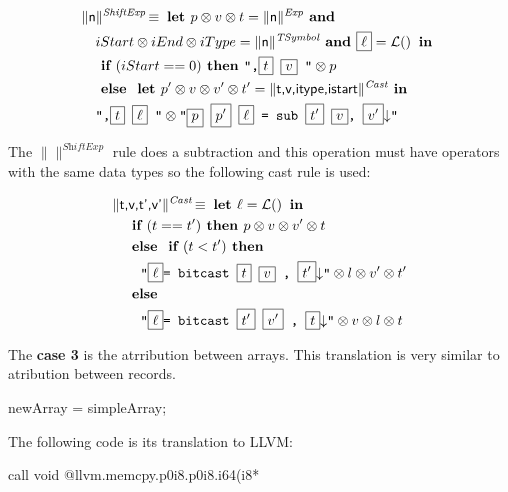 \documentclass{llncs}
\newcommand{\trad}[2]{\ensuremath{\lVert \textsf{#1} \rVert^{\textit{#2}}}}
\newcommand{\nl}[0]{\ensuremath{\downarrow}}
\DeclareMathOperator{\isdef}{\equiv}
\DeclareMathOperator{\lbl}{\mathcal{L}()}
\newcommand{\llvm}[1]{\texttt{#1}}
\newcommand{\IF}[0]{\textbf{ if }}
\newcommand{\ELSE}[0]{\textbf{ else }}
\newcommand{\THEN}[0]{\textbf{ then }}
\newcommand{\LET}[0]{\textbf{ let }}
\newcommand{\IN}[0]{\textbf{ in }}
\newcommand{\AND}[0]{\textbf{ and }}
\newcommand{\PH}[1]{\framebox{$#1$}}
\newcommand{\sep}[0]{\otimes}
\begin{document}
\begin{align*}
&\trad{n}{ShiftExp} \isdef \LET p \sep v \sep t  = \trad{n}{Exp} \AND \\
&\quad iStart \sep iEnd \sep iType = \trad{n}{TSymbol}  \AND  \PH{\ell} = \lbl \IN \\
&\quad \IF ( iStart == 0 ) \THEN  \llvm{",\PH{t} \PH{v} "} \sep p \\
&\quad \ELSE \LET  p' \sep v \sep v' \sep t'  = \trad{t,v,itype,istart}{Cast} \IN \\
&\quad \llvm{",\PH{t} \PH{\ell} "} \sep  \llvm{"\PH{p} \PH{p'}  \PH{\ell} = sub \PH{t'} \PH{v}, \PH{v'}\nl"}  \\
\end{align*}

The \trad{}{ShiftExp} rule does a subtraction and this operation must have operators with the same data types so the following cast rule is used:

\begin{align*}
&\trad{t,v,t',v'}{Cast} \isdef \LET  \ell = \lbl \IN \\
&\quad \IF ( t == t') \THEN p \sep v \sep v' \sep t  \\
&\quad \ELSE \IF (t<t') \THEN \\
&\quad \quad \llvm{"\PH{\ell}= bitcast \PH{t} \PH{v} , \PH{t'}\nl"}  \sep l \sep v' \sep t'\\ 
&\quad \ELSE \\ 
&\quad \quad \llvm{"\PH{\ell}= bitcast \PH{t'} \PH{v'} , \PH{t}\nl"} \sep v \sep l \sep t \\ 
\end{align*}


The \textbf{case 3} is the atrribution between arrays. This translation is 
very similar to atribution between records.

\begin{pascalcode}
	newArray = simpleArray;
\end{pascalcode}


The following code is its translation to LLVM:

\begin{llvmcode}
call void @llvm.memcpy.p0i8.p0i8.i64(i8* %
\end{llvmcode}
\end{document}
